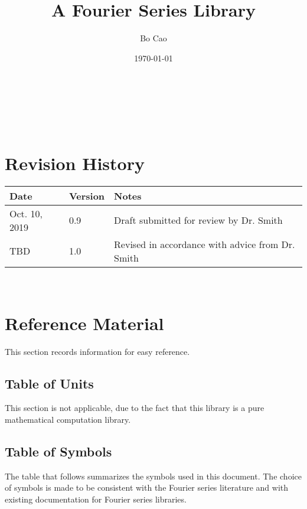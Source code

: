 \documentclass[12pt]{article}
\begin{document}
\title{\progname\\A Fourier Series Library} 
\author{Bo Cao}
\date{\today}
	
\maketitle

~\newpage


\tableofcontents

~\newpage

\section*{Revision History}

\begin{tabularx}{\textwidth}{p{3cm}p{2cm}X}
	\toprule {\bf Date} & {\bf Version} & {\bf Notes}\\
	\midrule
	Oct. 10, 2019 & 0.9 & Draft submitted for review by Dr. Smith\\
	TBD & 1.0 & Revised in accordance with advice from Dr. Smith\\
	\bottomrule
\end{tabularx}

~\newpage

\section{Reference Material}

This section records information for easy reference.

\subsection{Table of Units}

This section is not applicable, due to the fact that this library is a pure mathematical computation library.

\subsection{Table of Symbols}

The table that follows summarizes the symbols used in this document. 
The choice of symbols is made to be consistent with the Fourier 
series literature and with existing documentation for Fourier series 
libraries.
\end{document}
